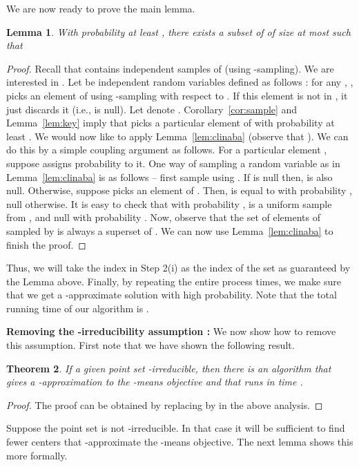 \documentclass[a4paper]{article}
\newtheorem{theorem}{Theorem}
\newtheorem{lemma}[theorem]{Lemma}
\begin{document}
\noindent
We are now ready to prove the main lemma.
\begin{lemma}
\label{lem:final}
With probability at least ,
there exists a subset  of  of size at most  such that

\end{lemma}
\begin{proof}
Recall that  contains  independent samples of  (using -sampling). We are interested in .
Let  be   independent random variables defined as follows : for any , ,  picks an element of  using -sampling with respect to
. If this element is not in , it just discards it (i.e.,  is null). Let  denote . Corollary~\ref{cor:sample}
 and Lemma~\ref{lem:key} imply that
 picks a particular element of  with probability at least . We would now like to apply Lemma~\ref{lem:clinaba}
(observe that ). We can do this by a simple coupling argument as follows.
For a particular element ,
suppose  assigns probability  to it.
 One way of sampling a random variable
 as in Lemma~\ref{lem:clinaba} is as follows --  first sample using . If  is null then,  is also null. Otherwise, suppose
 picks an element  of . Then,  is equal to  with probability , null otherwise. It is easy
to check that with probability ,  is a uniform sample from , and null with probability . Now, observe that
the set of elements of  sampled by  is always a superset of . We can now use Lemma~\ref{lem:clinaba}
to finish the proof.
\end{proof}

 Thus, we will take the index  in Step 2(i) as the index of the set  as guaranteed by the Lemma above.
Finally, by repeating the entire process  times, we make sure that we get a -approximate solution
with high probability.
Note that the total running time of our algorithm is
.

\noindent
{\bf Removing the -irreducibility assumption :} We now show how to remove this assumption. First note
that we have shown the following result.

\begin{theorem}
If a given point set -irreducible, then
there is an algorithm that gives a -approximation to the -means objective
and that runs in time .
\end{theorem}
\begin{proof}
The proof can be obtained by replacing  by  in the above analysis. \end{proof}

Suppose the point set  is not -irreducible.
In that case it will be sufficient to find fewer centers that -approximate the -means objective.
The next lemma shows this more formally.
\end{document}
